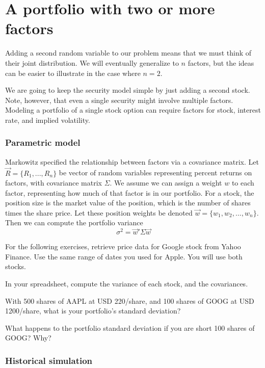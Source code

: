 \documentclass{report}
\numberwithin{problem}{chapter} %
\let\oldroblem\problem
\renewcommand{\problem}{ \oldroblem  \normalfont}
\begin{document}
\section{A portfolio with two or more factors}
Adding a second random variable to our problem means that we must think of their joint distribution. We will eventually generalize to $n$ factors, but the ideas can be easier to illustrate in the case where $n=2$. 

We are going to keep the security model simple by just adding a second stock. Note, however, that even a single security might involve multiple factors. Modeling a portfolio of a single stock option can require factors for stock, interest rate, and implied volatility. 

\subsubsection{Parametric model}
Markowitz specified the relationship between factors via a covariance matrix. Let $\vec{R}=\{R_1, ...,R_n\}$ be vector of random variables representing percent returns on factors, with covariance matrix $\Sigma$. We assume we can assign a weight $w$ to each factor, representing how much of that factor is in our portfolio. For a stock, the position size is the market value of the position, which is the number of shares times the share price. Let these position weights be denoted $\vec{w} = \{ w_1, w_2, ..., w_n\}$. Then we can compute the portfolio variance 
\begin{equation}
\sigma^2 = \vec{w}' \Sigma \vec{w}
\end{equation}

For the following exercises, retrieve price data for Google stock from Yahoo Finance. Use the same range of dates you used for Apple. You will use both stocks. 

\problem In your spreadsheet, compute the variance of each stock, and the covariances.

\problem With 500 shares of AAPL at USD 220/share, and 100 shares of GOOG at USD 1200/share, what is your portfolio's standard deviation?

\problem What happens to the portfolio standard deviation if you are short 100 shares of GOOG? Why?

\subsubsection{Historical simulation}
\end{document}
